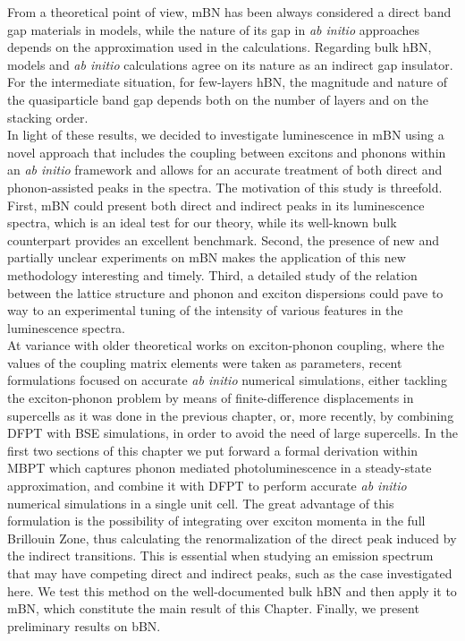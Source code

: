 From a theoretical point of view, mBN has been always considered a direct band gap materials in models\cite{galvani2016excitons}, while the nature of its gap in \emph{ab initio} approaches depends on the approximation used in the calculations.\cite{prete2020giant,mengle2019impact} Regarding bulk hBN, models and \emph{ab initio} calculations agree on its nature as an indirect gap insulator.\cite{sponza2018direct}
For the intermediate situation, for few-layers hBN, the magnitude and nature of the quasiparticle band gap depends both on the number of layers and on the stacking order.\cite{sponza2018direct,mengle2019impact,latil2022electronic}\\

In light of these results, we decided to investigate luminescence in mBN using a novel approach that includes the coupling between excitons and phonons within an \emph{ab initio} framework and allows for an accurate treatment of both direct and phonon-assisted peaks in the spectra.
The motivation of this study is threefold.
First, mBN could present both direct and indirect peaks in its luminescence spectra, which is an ideal test for our theory, while its well-known bulk counterpart provides an excellent benchmark.
Second, the presence of new and partially unclear experiments on \acrshort{mBN} makes the application of this new methodology interesting and timely.
Third, a detailed study of the relation between the lattice structure and phonon and exciton dispersions could pave to way to an experimental tuning of the intensity of various features in the luminescence spectra. \\

At variance with older theoretical works on exciton-phonon coupling, where the values of the coupling matrix elements were taken as parameters, recent formulations focused on accurate \emph{ab initio} numerical simulations, either tackling the exciton-phonon problem by means of finite-difference displacements in supercells as it was done in the previous chapter, or, more recently, by combining \acrshort{DFPT} with \acrshort{BSE} simulations, in order to avoid the need of large supercells.\cite{chen2020exciton}
In the first two sections of this chapter we put forward a formal derivation within \acrshort{MBPT} which captures phonon mediated photoluminescence in a steady-state approximation, and combine it with \acrshort{DFPT} to perform accurate \emph{ab initio} numerical simulations in a single unit cell.
The great advantage of this formulation is the possibility of integrating over exciton momenta in the full Brillouin Zone, thus calculating the renormalization of the direct peak induced by the indirect transitions. This is essential when studying an emission spectrum that may have competing direct and indirect peaks, such as the case investigated here. We test this method on the well-documented bulk \acrshort{hBN} and then apply it to \acrshort{mBN}, which constitute the main result of this Chapter. Finally, we present preliminary results on \acrshort{bBN}.

